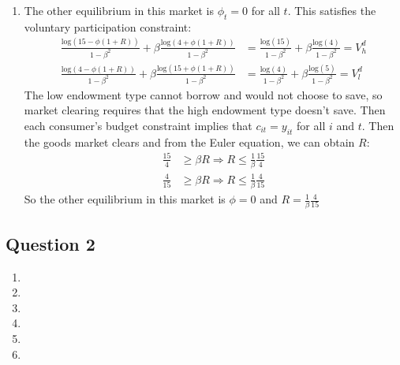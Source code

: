 \documentclass{article}
\newcommand{\loge}[1]{\text{log}\left(#1\right)}
\begin{document}
\begin{enumerate}
	\item The other equilibrium in this market is ${\phi_t=0}$ for all $t$. This satisfies the voluntary participation constraint:
		\begin{align*}
			\frac{\loge{15-\phi(1+R)}}{1-\beta^2} + \beta\frac{\loge{4+\phi(1+R)}}{1-\beta^2} &= 
				\frac{\loge{15}}{1-\beta^2} + \beta\frac{\loge{4}}{1-\beta^2} = V^d_h				\\
			\frac{\loge{4-\phi(1+R)}}{1-\beta^2} + \beta\frac{\loge{15+\phi(1+R)}}{1-\beta^2} &= 
				\frac{\loge{4}}{1-\beta^2} + \beta\frac{\loge{5}}{1-\beta^2} = V^d_l				
		\end{align*}
		The low endowment type cannot borrow and would not choose to save, so market clearing requires that the high endowment type doesn't save. Then each consumer's budget constraint implies that ${c_{it}=y_{it}}$ for all $i$ and $t$. Then the goods market clears and from the Euler equation, we can obtain $R$:
		\begin{align*}
			\frac{15}{4}	&\geq \beta R	\Rightarrow R \leq \frac{1}{\beta}\frac{15}{4}\\
			\frac{4}{15}	&\geq \beta R	\Rightarrow R \leq \frac{1}{\beta}\frac{4}{15}
		\end{align*}
		So the other equilibrium in this market is ${\phi=0}$ and ${R = \frac{1}{\beta}\frac{4}{15}}$
	
\end{enumerate}


\pagebreak
\subsection*{Question 2}

\begin{enumerate}
	\item 
	
	\item 
	
	\item 
	
	\item 
	
	\item 
	
	\item 
	
\end{enumerate}

\end{document}

